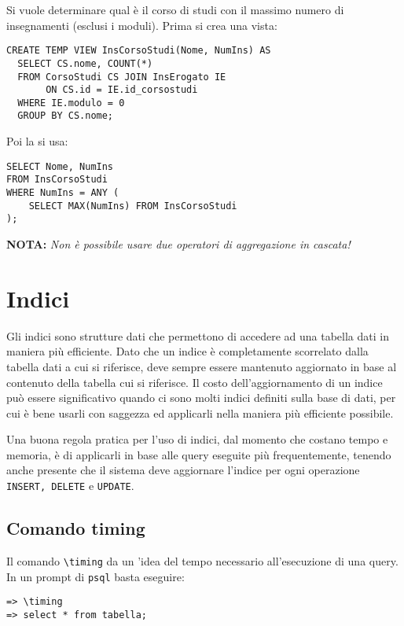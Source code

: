 \documentclass[a4paper, 10pt]{article}
\begin{document}
		\noindent
		Si vuole determinare qual è il corso di studi con il massimo numero di
		insegnamenti (esclusi i moduli).
		Prima si crea una vista:
	\begin{lstlisting}
CREATE TEMP VIEW InsCorsoStudi(Nome, NumIns) AS
  SELECT CS.nome, COUNT(*)
  FROM CorsoStudi CS JOIN InsErogato IE 
       ON CS.id = IE.id_corsostudi
  WHERE IE.modulo = 0
  GROUP BY CS.nome;
	\end{lstlisting}
		Poi la si usa:
		\begin{lstlisting}
SELECT Nome, NumIns
FROM InsCorsoStudi
WHERE NumIns = ANY (
    SELECT MAX(NumIns) FROM InsCorsoStudi
);

		\end{lstlisting}
		
		\noindent
		\textbf{NOTA: } \textit{Non è possibile usare due operatori di aggregazione in cascata!}
	\newpage		
	\section{Indici}
	Gli indici sono strutture dati che permettono di accedere ad una tabella dati in maniera più efficiente. Dato che un indice è completamente scorrelato dalla tabella dati a cui si riferisce, deve sempre essere mantenuto aggiornato in base al contenuto della tabella cui si riferisce. Il costo dell'aggiornamento di un indice può essere significativo quando ci sono molti indici definiti sulla base di dati, per cui è bene usarli con saggezza ed applicarli nella maniera più efficiente possibile.
	
	Una buona regola pratica per l'uso di indici, dal momento che costano tempo e memoria, è di applicarli in base alle query eseguite più frequentemente, tenendo anche presente che il sistema deve aggiornare l'indice per ogni operazione \lstinline|INSERT, DELETE| e \lstinline|UPDATE|.
	
	\subsection{Comando timing}
	Il comando \lstinline|\timing| da un 'idea del tempo necessario all'esecuzione di una query.
	In un prompt di \verb|psql| basta eseguire:
	\begin{lstlisting}
=> \timing
=> select * from tabella;
	\end{lstlisting}
\end{document}
